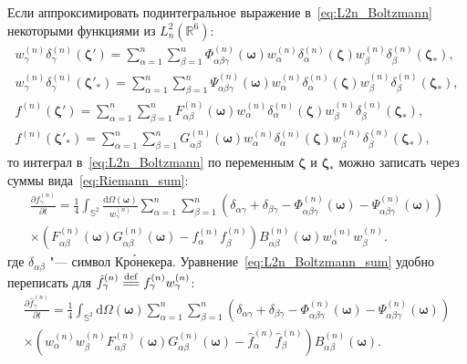 \documentclass{article}
\newcommand{\dd}{\mathrm{d}}
\newcommand{\pder}[2][]{\frac{\partial#1}{\partial#2}}
\newcommand{\bzeta}{\boldsymbol{\zeta}}
\newcommand{\bomega}{\boldsymbol{\omega}}
\newcommand{\eqdef}{\overset{\mathrm{def}}{=\joinrel=}}
\begin{document}
Если аппроксимировать подинтегральное выражение в~\eqref{eq:L2n_Boltzmann} некоторыми функциями из \(L^2_n(\mathbb{R}^6)\):
\begin{gather}
    w^{(n)}_\gamma \delta^{(n)}_\gamma(\bzeta') = \sum_{\alpha=1}^n \sum_{\beta=1}^n
        \Phi^{(n)}_{\alpha\beta\gamma}(\bomega) w^{(n)}_\alpha \delta^{(n)}_\alpha(\bzeta)
        w^{(n)}_\beta \delta^{(n)}_\beta(\bzeta_*), \label{eq:Phi_abc}\\
    w^{(n)}_\gamma \delta^{(n)}_\gamma(\bzeta'_*) = \sum_{\alpha=1}^n \sum_{\beta=1}^n
        \Psi^{(n)}_{\alpha\beta\gamma}(\bomega) w^{(n)}_\alpha \delta^{(n)}_\alpha(\bzeta)
        w^{(n)}_\beta \delta^{(n)}_\beta(\bzeta_*), \label{eq:Psi_abc}\\
    f^{(n)}(\bzeta') = \sum_{\alpha=1}^n \sum_{\beta=1}^n
        F^{(n)}_{\alpha\beta}(\bomega) w^{(n)}_\alpha \delta^{(n)}_\alpha(\bzeta)
        w^{(n)}_\beta \delta^{(n)}_\beta(\bzeta_*), \label{eq:F_ab}\\
    f^{(n)}(\bzeta'_*) = \sum_{\alpha=1}^n \sum_{\beta=1}^n
        G^{(n)}_{\alpha\beta}(\bomega) w^{(n)}_\alpha \delta^{(n)}_\alpha(\bzeta)
        w^{(n)}_\beta \delta^{(n)}_\beta(\bzeta_*), \label{eq:G_ab}
\end{gather}
то интеграл в~\eqref{eq:L2n_Boltzmann} по переменным \(\bzeta\) и \(\bzeta_*\)
можно записать через суммы вида~\eqref{eq:Riemann_sum}:
\begin{multline}\label{eq:L2n_Boltzmann_sum}
    \pder[f^{(n)}_\gamma]{t} =
        \frac14\int_{\mathbb{S}^2}\frac{\dd\Omega(\bomega)}{w^{(n)}_\gamma} \sum_{\alpha=1}^n \sum_{\beta=1}^n
        \left(\delta_{\alpha\gamma} + \delta_{\beta\gamma}
            - \Phi^{(n)}_{\alpha\beta\gamma}(\bomega) - \Psi^{(n)}_{\alpha\beta\gamma}(\bomega)\right) \\
        \times\left(F^{(n)}_{\alpha\beta}(\bomega)G^{(n)}_{\alpha\beta}(\bomega) - f^{(n)}_\alpha f^{(n)}_\beta\right)
        B^{(n)}_{\alpha\beta}(\bomega) w^{(n)}_\alpha w^{(n)}_\beta.
\end{multline}
где \(\delta_{\alpha\beta}\) "--- символ Кр\'{о}некера. Уравнение~\eqref{eq:L2n_Boltzmann_sum}
удобно переписать для \(\hat{f}^{(n)}_\gamma \eqdef f^{(n)}_\gamma w^{(n)}_\gamma\):
\begin{multline}\label{eq:L2n_Boltzmann_sum_hat}
    \pder[\hat{f}^{(n)}_\gamma]{t} =
        \frac14\int_{\mathbb{S}^2}\dd\Omega(\bomega) \sum_{\alpha=1}^n \sum_{\beta=1}^n
        \left(\delta_{\alpha\gamma} + \delta_{\beta\gamma}
            - \Phi^{(n)}_{\alpha\beta\gamma}(\bomega) - \Psi^{(n)}_{\alpha\beta\gamma}(\bomega)\right) \\
        \times\left(w^{(n)}_\alpha w^{(n)}_\beta F^{(n)}_{\alpha\beta}(\bomega)G^{(n)}_{\alpha\beta}(\bomega)
            - \hat{f}^{(n)}_\alpha \hat{f}^{(n)}_\beta\right)
        B^{(n)}_{\alpha\beta}(\bomega).
\end{multline}
\end{document}
